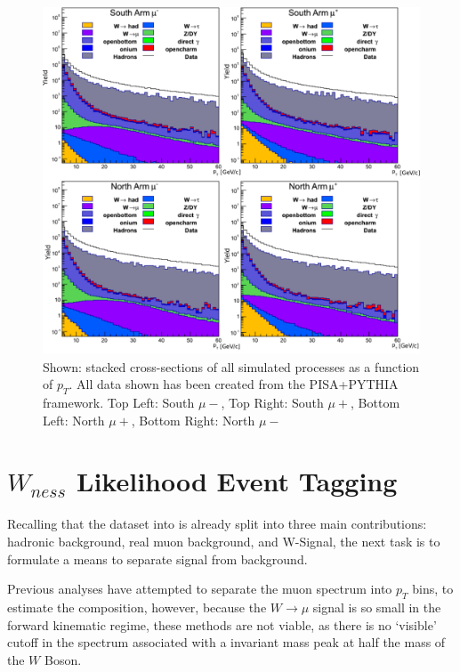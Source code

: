 \begin{figure}[ht]
  \centering
  \includegraphics[width=\linewidth]{./figures/stacked_xsec.png}
  \caption{
    Shown: stacked cross-sections of all simulated processes as a
    function of $p_T$. All data shown has been created from the PISA+PYTHIA
    framework. Top Left: South $\mu-$, Top Right: South $\mu+$, Bottom Left:
    North $\mu+$, Bottom Right: North $\mu-$~\cite{Seidl2014a}
  }
  \label{fig:stacked_xsec_sim}
\end{figure}

\clearpage


\section{$W_{ness}$ Likelihood Event Tagging}
\label{sec:likelihood}

Recalling that the dataset into is already split into three main contributions:
hadronic background, real muon background, and W-Signal, the next task is to 
formulate a means to separate signal from background.

Previous analyses have attempted to separate the muon spectrum into $p_T$ bins,
to estimate the composition, however, because the $W\rightarrow\mu$ signal is so
small in the forward kinematic regime, these methods are not viable, as
there is no `visible' cutoff in the spectrum associated with a invariant mass
peak at half the mass of the $W$ Boson.

